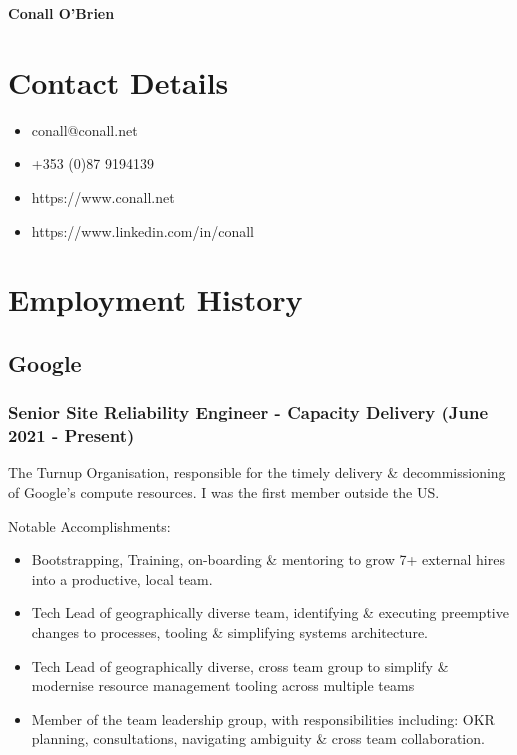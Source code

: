 \documentclass[a4paper, 10pt] {article}
\begin{document}
\begingroup
  \centering
  \LARGE \textbf{Conall O'Brien}\\[1.5em]
\endgroup

\hrulefill

\section*{Contact Details}

\begin{multicols}{2}

  \begin{itemize}
    \item conall@conall.net
    \item +353 (0)87 9194139
    \item https://www.conall.net
    \item https://www.linkedin.com/in/conall
  \end{itemize}

\end{multicols}

\hrulefill

\section*{Employment History}

\subsection*{Google}

\subsubsection*{Senior Site Reliability Engineer - Capacity Delivery (June 2021 - Present)}

The Turnup Organisation, responsible for the timely delivery \& decommissioning of Google's compute resources. I was the first member outside the US.

\vspace{3mm}  %

Notable Accomplishments:

\begin{itemize}[itemsep=2pt,parsep=2pt]
  \item Bootstrapping, Training, on-boarding \& mentoring to grow 7+ external hires into a productive, local team.
  \item Tech Lead of geographically diverse team, identifying \& executing preemptive changes to processes, tooling \& simplifying systems architecture.
  \item Tech Lead of geographically diverse, cross team group to simplify \&  modernise resource management tooling across multiple teams
  \item Member of the team leadership group, with responsibilities including: OKR planning, consultations, navigating ambiguity \& cross team collaboration.
\end{itemize}
\end{document}
